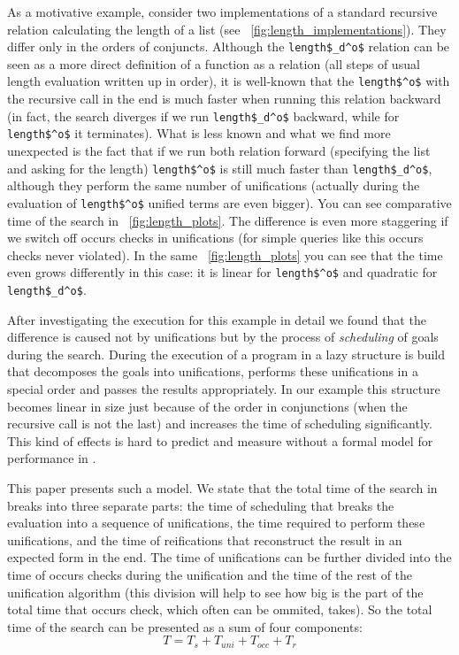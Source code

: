 As a motivative example, consider two implementations of a standard recursive relation calculating the length of a list (see \figureword~\ref{fig:length_implementations}). They differ only in the
orders of conjuncts. Although the \lstinline|length$_d^o$| relation can be seen as a more direct definition of a function as a relation (all steps of usual length evaluation written up in order),
it is well-known that the \lstinline|length$^o$| with the recursive call in the end is much faster when running this relation backward (in fact, the search diverges if we
run \lstinline|length$_d^o$| backward, while for \lstinline|length$^o$| it terminates). What is less known and what we find more unexpected is the fact that if we run both relation
forward (specifying the list and asking for the length) \lstinline|length$^o$| is still much faster than \lstinline|length$_d^o$|, although they perform the same number of unifications
(actually during the evaluation of \lstinline|length$^o$| unified terms are even bigger). You can see comparative time of the search in \figureword~\ref{fig:length_plots}. The difference is even
more staggering if we switch off occurs checks in unifications (for simple queries like this occurs checks never violated). In the same \figureword~\ref{fig:length_plots} you can see that
the time even grows differently in this case: it is linear for \lstinline|length$^o$| and quadratic for \lstinline|length$_d^o$|.

After investigating the execution for this example in detail we found that the difference is caused not by unifications but by the process of \emph{scheduling} of goals during the search.
During the execution of a program in \mK a lazy structure is build that decomposes the goals into unifications, performs these unifications in a special order and passes the results
appropriately. In our example this structure becomes linear in size just because of the order in conjunctions (when the recursive call is not the last) and increases the time of
scheduling significantly. This kind of effects is hard to predict and measure without a formal model for performance in \mK.

This paper presents such a model. We state that the total time of the search in \mK breaks into three separate parts: the time of scheduling that breaks the evaluation into a sequence of
unifications, the time required to perform these unifications, and the time of reifications that reconstruct the result in an expected form in the end. The time of unifications can be further
divided into the time of occurs checks during the unification and the time of the rest of the unification algorithm (this division will help to see how big is the part of the total time
that occurs check, which often can be ommited, takes). So the total time of the search can be presented as a sum of four components: \[ T = T_s + T_{uni} + T_{occ} + T_r \]

